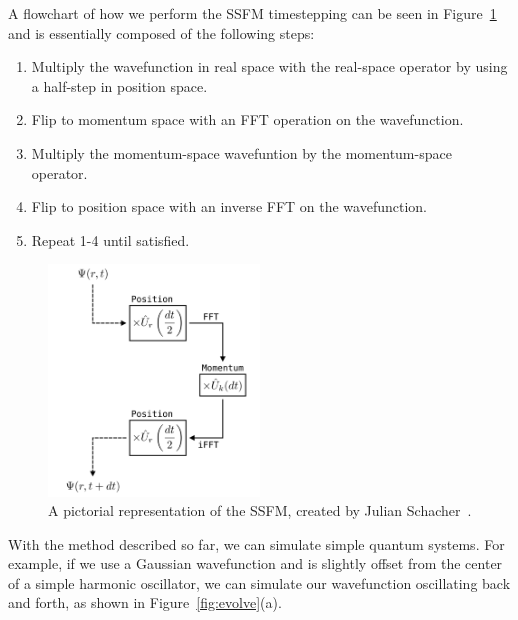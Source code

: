 A flowchart of how we perform the SSFM timestepping can be seen in Figure~\ref{fig:method} and is essentially composed of the following steps:

\begin{enumerate}
\item Multiply the wavefunction in real space with the real-space operator by using a half-step in position space.
\item Flip to momentum space with an FFT operation on the wavefunction.
\item Multiply the momentum-space wavefuntion by the momentum-space operator.
\item Flip to position space with an inverse FFT on the wavefunction.
\item Repeat 1-4 until satisfied.
\end{enumerate}

\begin{figure}
\center \includegraphics[width=0.5\textwidth]{data/splitop/method/split_op_method.pdf}

\caption{A pictorial representation of the SSFM, created by Julian Schacher~\cite{AAA}.}
\label{fig:method}
\end{figure}

With the method described so far, we can simulate simple quantum systems.
For example, if we use a Gaussian wavefunction and is slightly offset from the center of a simple harmonic oscillator, we can simulate our wavefunction oscillating back and forth, as shown in Figure~\ref{fig:evolve}(a).

